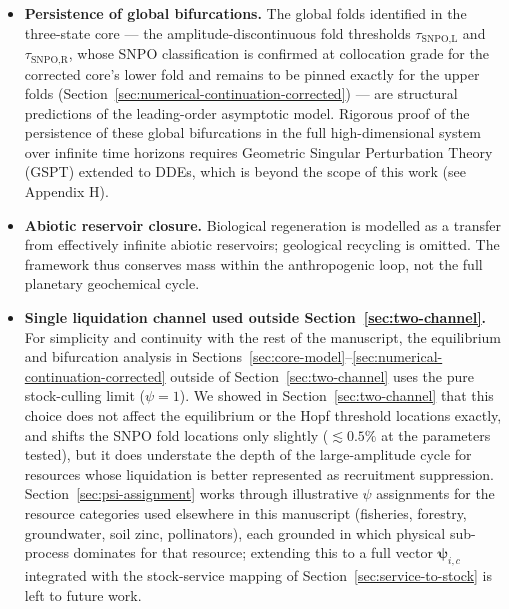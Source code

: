 \documentclass[twocolumn,10pt]{article}
\begin{document}
\begin{itemize}
\item \textbf{Persistence of global bifurcations.} The global folds identified in the three-state core --- the amplitude-discontinuous fold thresholds $\tau_{\text{SNPO,L}}$ and $\tau_{\text{SNPO,R}}$, whose SNPO classification is confirmed at collocation grade for the corrected core's lower fold and remains to be pinned exactly for the upper folds (Section~\ref{sec:numerical-continuation-corrected}) --- are structural predictions of the leading-order asymptotic model. Rigorous proof of the persistence of these global bifurcations in the full high-dimensional system over infinite time horizons requires Geometric Singular Perturbation Theory (GSPT) extended to DDEs, which is beyond the scope of this work (see Appendix H).
\item \textbf{Abiotic reservoir closure.} Biological regeneration is modelled as a transfer from effectively infinite abiotic reservoirs; geological recycling is omitted. The framework thus conserves mass within the anthropogenic loop, not the full planetary geochemical cycle.
\item \textbf{Single liquidation channel used outside Section~\ref{sec:two-channel}.} For simplicity and continuity with the rest of the manuscript, the equilibrium and bifurcation analysis in Sections~\ref{sec:core-model}--\ref{sec:numerical-continuation-corrected} outside of Section~\ref{sec:two-channel} uses the pure stock-culling limit ($\psi=1$). We showed in Section~\ref{sec:two-channel} that this choice does not affect the equilibrium or the Hopf threshold locations exactly, and shifts the SNPO fold locations only slightly ($\lesssim0.5\%$ at the parameters tested), but it does understate the depth of the large-amplitude cycle for resources whose liquidation is better represented as recruitment suppression. Section~\ref{sec:psi-assignment} works through illustrative $\psi$ assignments for the resource categories used elsewhere in this manuscript (fisheries, forestry, groundwater, soil zinc, pollinators), each grounded in which physical sub-process dominates for that resource; extending this to a full vector $\boldsymbol\psi_{i,c}$ integrated with the stock-service mapping of Section~\ref{sec:service-to-stock} is left to future work.

\end{itemize}
\end{document}

